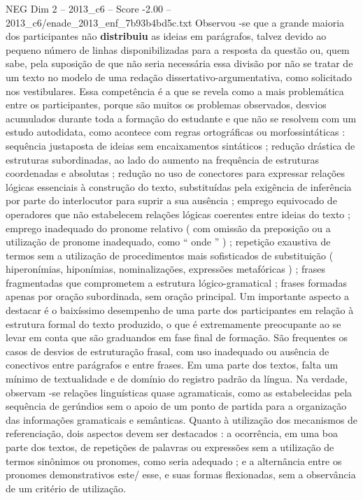 \begin{textsample}{NEG Dim 2 – 2013\_c6 – Score -2.00 – 2013\_c6/enade\_2013\_enf\_7b93b4bd5c.txt}
Observou -se que a grande maioria dos participantes não \textbf{distribuiu} as ideias em parágrafos, talvez devido ao pequeno número de linhas disponibilizadas para a resposta da questão ou, quem sabe, pela suposição de que não seria necessária essa divisão por não se tratar de um texto no modelo de uma redação dissertativo-argumentativa, como solicitado nos vestibulares.
Essa competência é a que se revela como a mais problemática entre os participantes, porque são muitos os problemas observados, desvios acumulados durante toda a formação do estudante e que não se resolvem com um estudo autodidata, como acontece com regras ortográficas ou morfossintáticas : sequência justaposta de ideias sem encaixamentos sintáticos ; redução drástica de estruturas subordinadas, ao lado do aumento na frequência de estruturas coordenadas e absolutas ; redução no uso de conectores para expressar relações lógicas essenciais à construção do texto, substituídas pela exigência de inferência por parte do interlocutor para suprir a sua ausência ; emprego equivocado de operadores que não estabelecem relações lógicas coerentes entre ideias do texto ; emprego inadequado do pronome relativo ( com omissão da preposição ou a utilização de pronome inadequado, como “ onde ” ) ; repetição exaustiva de termos sem a utilização de procedimentos mais sofisticados de substituição ( hiperonímias, hiponímias, nominalizações, expressões metafóricas ) ; frases fragmentadas que comprometem a estrutura lógico-gramatical ; frases formadas apenas por oração subordinada, sem oração principal.
Um importante aspecto a destacar é o baixíssimo desempenho de uma parte dos participantes em relação à estrutura formal do texto produzido, o que é extremamente preocupante ao se levar em conta que são graduandos em fase final de formação.
São frequentes os casos de desvios de estruturação frasal, com uso inadequado ou ausência de conectivos entre parágrafos e entre frases.
Em uma parte dos textos, falta um mínimo de textualidade e de domínio do registro padrão da língua.
Na verdade, observam -se relações linguísticas quase agramaticais, como as estabelecidas pela sequência de gerúndios sem o apoio de um ponto de partida para a organização das informações gramaticais e semânticas.
Quanto à utilização dos mecanismos de referenciação, dois aspectos devem ser destacados : a ocorrência, em uma boa parte dos textos, de repetições de palavras ou expressões sem a utilização de termos sinônimos ou pronomes, como seria adequado ; e a alternância entre os pronomes demonstrativos este/ esse, e suas formas flexionadas, sem a observância de um critério de utilização.

\end{textsample}
